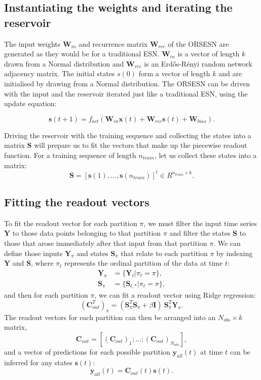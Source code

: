 \subsection{Instantiating the weights and iterating the reservoir}

The input weights $\mathbf{W}_{in}$ and recurrence matrix $\mathbf{W}_{rec}$ of the ORSESN are generated as they would be for a traditional ESN. $\mathbf{W}_{in}$ is a vector of length $k$ drawn from a Normal distribution and $\mathbf{W}_{rec}$ is an Erd\H{o}s-R\'enyi random network adjacency matrix. The initial states $s(0)$ form a vector of length $k$ and are initialised by drawing from a Normal distribution. The ORSESN can be driven with the input and the reservoir iterated just like a traditional ESN, using the update equation:

\[
    \mathbf{s}(t + 1) = f_{act}(\mathbf{W}_{in}\mathbf{x}(t) + \mathbf{W}_{rec}\mathbf{s}(t) + \mathbf{W}_{bias}).
\]

Driving the reservoir with the training sequence and collecting the states into a matrix $\mathbf{S}$ will prepare us to fit the vectors that make up the piecewise readout function. For a training sequence of length $n_{train}$, let us collect these states into a matrix:
\[
    \mathbf{S} = [\mathbf{s}(1), ..., \mathbf{s}(n_{train})]^t \in R^{n_{train}\times k}.
\]

\subsection{Fitting the readout vectors}

To fit the readout vector for each partition $\pi$, we must filter the input time series $\mathbf{Y}$ to those data points belonging to that partition $\pi$ and filter the states $\mathbf{S}$ to those that arose immediately after that input from that partition $\pi$. We can define those inputs $\mathbf{Y}_\pi$ and states $\mathbf{S}_{\pi}$ that relate to each partition $\pi$ by indexing $\mathbf{Y}$ and $\mathbf{S}$, where $\pi_t$ represents the ordinal partition of the data at time $t$:
\begin{align*}
    \mathbf{Y}_\pi &= \{\mathbf{Y}_{t} | \pi_t = \pi\}, \\
    \mathbf{S}_\pi &= \{\mathbf{S}_{t,*} | \pi_t = \pi\},
\end{align*}
and then for each partition $\pi$, we can fit a readout vector using Ridge regression:
\[
    (\mathbf{C}_{out}^T)_\pi = (\mathbf{S}_\pi^T \mathbf{S}_\pi + \beta \mathbf{I}) \ \mathbf{S}_\pi^T \mathbf{Y}_\pi.
\]
The readout vectors for each partition can then be arranged into an $N_{obs}\times k$ matrix,
\[
    \mathbf{C}_{out} = [(\mathbf{C}_{out})_1; ...; (\mathbf{C}_{out})_{N_{obs}}],
\]
and a vector of predictions for each possible partition $\mathbf{y}_{all}(t)$ at time $t$ can be inferred for any states $\mathbf{s}(t)$:
\[
    \mathbf{y}_{all}(t) = \mathbf{C}_{out}(t)\mathbf{s}(t).
\]

